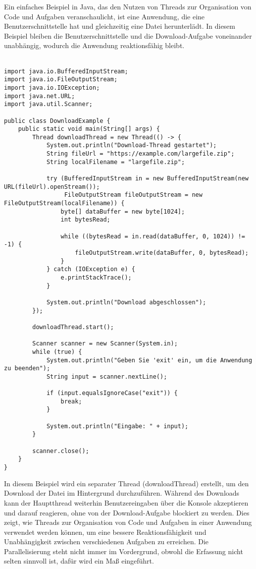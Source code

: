 Ein einfaches Beispiel in Java, das den Nutzen von Threads zur Organisation von Code und Aufgaben veranschaulicht, ist eine Anwendung, die eine Benutzerschnittstelle hat und gleichzeitig eine Datei herunterlädt. In diesem Beispiel bleiben die Benutzerschnittstelle und die Download-Aufgabe voneinander unabhängig, wodurch die Anwendung reaktionsfähig bleibt.\\\\
\begin{lstlisting}[caption={Threads zur Organisation},captionpos=b,label={lst:orga}]
import java.io.BufferedInputStream;
import java.io.FileOutputStream;
import java.io.IOException;
import java.net.URL;
import java.util.Scanner;

public class DownloadExample {
    public static void main(String[] args) {
        Thread downloadThread = new Thread(() -> {
            System.out.println("Download-Thread gestartet");
            String fileUrl = "https://example.com/largefile.zip";
            String localFilename = "largefile.zip";

            try (BufferedInputStream in = new BufferedInputStream(new URL(fileUrl).openStream());
                 FileOutputStream fileOutputStream = new FileOutputStream(localFilename)) {
                byte[] dataBuffer = new byte[1024];
                int bytesRead;

                while ((bytesRead = in.read(dataBuffer, 0, 1024)) != -1) {
                    fileOutputStream.write(dataBuffer, 0, bytesRead);
                }
            } catch (IOException e) {
                e.printStackTrace();
            }

            System.out.println("Download abgeschlossen");
        });

        downloadThread.start();

        Scanner scanner = new Scanner(System.in);
        while (true) {
            System.out.println("Geben Sie 'exit' ein, um die Anwendung zu beenden");
            String input = scanner.nextLine();

            if (input.equalsIgnoreCase("exit")) {
                break;
            }

            System.out.println("Eingabe: " + input);
        }

        scanner.close();
    }
}
\end{lstlisting}
In diesem Beispiel wird ein separater Thread (downloadThread) erstellt, um den Download der Datei im Hintergrund durchzuführen. Während des Downloads kann der Hauptthread weiterhin Benutzereingaben über die Konsole akzeptieren und darauf reagieren, ohne von der Download-Aufgabe blockiert zu werden. Dies zeigt, wie Threads zur Organisation von Code und Aufgaben in einer Anwendung verwendet werden können, um eine bessere Reaktionsfähigkeit und Unabhängigkeit zwischen verschiedenen Aufgaben zu erreichen. Die Parallelisierung steht nicht immer im Vordergrund, obwohl die Erfassung nicht selten sinnvoll ist, dafür wird ein Maß eingeführt.

